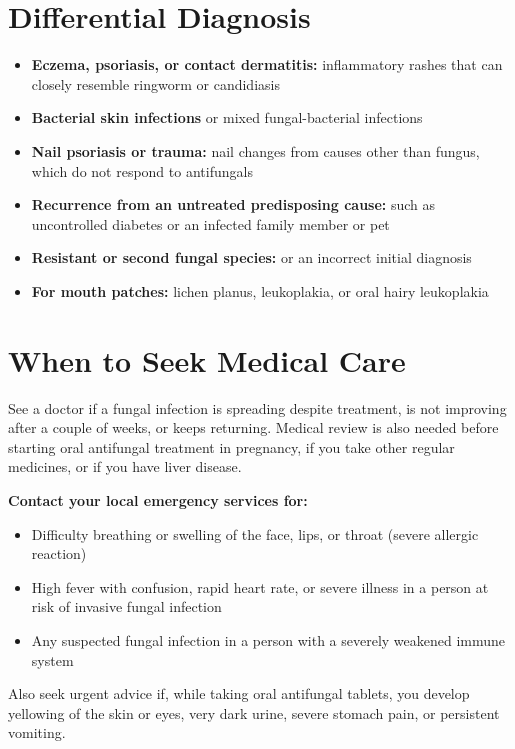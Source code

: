 \section*{Differential Diagnosis}
\begin{itemize}
    \item \textbf{Eczema, psoriasis, or contact dermatitis:} inflammatory rashes that can closely resemble ringworm or candidiasis
    \item \textbf{Bacterial skin infections} or mixed fungal-bacterial infections
    \item \textbf{Nail psoriasis or trauma:} nail changes from causes other than fungus, which do not respond to antifungals
    \item \textbf{Recurrence from an untreated predisposing cause:} such as uncontrolled diabetes or an infected family member or pet
    \item \textbf{Resistant or second fungal species:} or an incorrect initial diagnosis
    \item \textbf{For mouth patches:} lichen planus, leukoplakia, or oral hairy leukoplakia
\end{itemize}

\section*{When to Seek Medical Care}
See a doctor if a fungal infection is spreading despite treatment, is not improving after a couple of weeks, or keeps returning. Medical review is also needed before starting oral antifungal treatment in pregnancy, if you take other regular medicines, or if you have liver disease.

\textbf{Contact your local emergency services for:}
\begin{itemize}
    \item Difficulty breathing or swelling of the face, lips, or throat (severe allergic reaction)
    \item High fever with confusion, rapid heart rate, or severe illness in a person at risk of invasive fungal infection
    \item Any suspected fungal infection in a person with a severely weakened immune system
\end{itemize}

Also seek urgent advice if, while taking oral antifungal tablets, you develop yellowing of the skin or eyes, very dark urine, severe stomach pain, or persistent vomiting.

